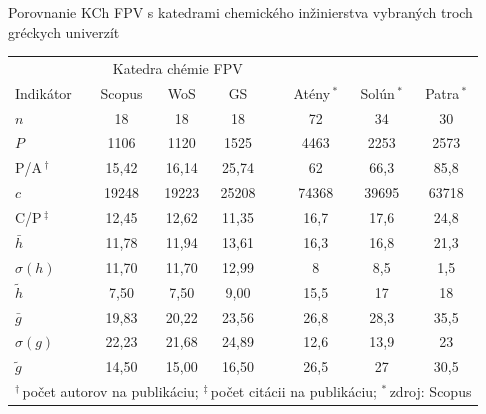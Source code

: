 \documentclass{beamer}
\begin{document}
%
%
\begin{frame}{Porovnanie KCh FPV s katedrami chemického inžinierstva vybraných troch gréckych univerzít}
  \begin{table}
    \footnotesize
    \begin{tabular}{lccclccc}
      \toprule
      & \multicolumn{3}{c}{Katedra chémie FPV} & & \multicolumn{3}{c}{\citet{Kazakis2015}} \\
      \cmidrule{2-4}\cmidrule{6-8}
      Indikátor & Scopus & WoS & GS & & Atény\,$^\ast$ & Solún\,$^\ast$ & Patra\,$^\ast$ \\
      \midrule
      $n$                              & 18    & 18    & 18    & & 72    & 34    & 30    \\
      \rowcolor{LBlue} $P$             & 1106  & 1120  & 1525  & & 4463  & 2253  & 2573  \\
      \rowcolor{LBlue} P/A\,$^\dagger$ & 15,42 & 16,14 & 25,74 & & 62    & 66,3  & 85,8  \\
      $c$                              & 19248 & 19223 & 25208 & & 74368 & 39695 & 63718 \\
      C/P\,$^\ddagger$                 & 12,45 & 12,62 & 11,35 & & 16,7  & 17,6  & 24,8  \\
      \rowcolor{LBlue} $\bar{h}$       & 11,78 & 11,94 & 13,61 & & 16,3  & 16,8  & 21,3  \\
      \rowcolor{LBlue} $\sigma (h)$    & 11,70 & 11,70 & 12,99 & & 8     & 8,5   & 1,5   \\
      \rowcolor{LBlue} $\tilde{h}$     & 7,50  & 7,50  & 9,00  & & 15,5  & 17    & 18    \\
      $\bar{g}$                        & 19,83 & 20,22 & 23,56 & & 26,8  & 28,3  & 35,5  \\
      $\sigma (g)$                     & 22,23 & 21,68 & 24,89 & & 12,6  & 13,9  & 23    \\
      $\tilde{g}$                      & 14,50 & 15,00 & 16,50 & & 26,5  & 27    & 30,5  \\
      \bottomrule
      \multicolumn{8}{l}{\tiny $^\dagger$\,počet autorov na publikáciu; $^\ddagger$\,počet citácii na publikáciu; $^\ast$\,zdroj: Scopus}
    \end{tabular}
  \end{table}
\end{frame}
\end{document}
